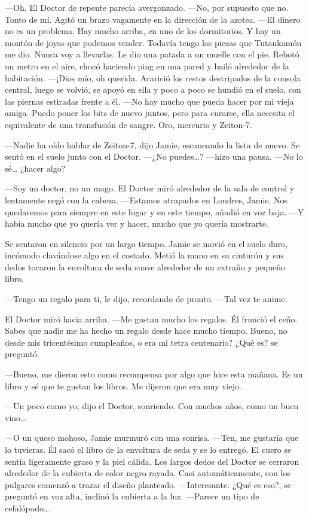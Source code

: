 ---Oh. El Doctor de repente parecía avergonzado. ---No, por supuesto que
no. Tonto de mí. Agitó un brazo vagamente en la dirección de la azotea.
---El dinero no es un problema. Hay mucho arriba, en uno de los
dormitorios. Y hay un montón de joyas que podemos vender. Todavía tengo
las piezas que Tutankamón me dio. Nunca voy a llevarlas. Le dio una
patada a un muelle con el pie. Rebotó un metro en el aire, chocó
haciendo ping en una pared y bailó alrededor de la habitación. ---¡Dios
mío, oh querida. Acarició los restos destripados de la consola central,
luego se volvió, se apoyó en ella y poco a poco se hundió en el suelo,
con las piernas estiradas frente a él. ---No hay mucho que pueda hacer
por mi vieja amiga. Puedo poner los bits de nuevo juntos, pero para
curarse, ella necesita el equivalente de una transfusión de sangre. Oro,
mercurio y Zeiton-7.

---Nadie ha oído hablar de Zeiton-7, dijo Jamie, escaneando la lista de
nuevo. Se sentó en el suelo junto con el Doctor. ---¿No puedes\ldots{}?
---hizo una pausa. ---No lo sé\ldots{} ¿hacer algo?

---Soy un doctor, no un mago. El Doctor miró alrededor de la sala de
control y lentamente negó con la cabeza. ---Estamos atrapados en
Londres, Jamie. Nos quedaremos para siempre en este lugar y en este
tiempo, añadió en voz baja. ---Y había mucho que yo quería ver y hacer,
mucho que yo quería mostrarte.

Se sentaron en silencio por un largo tiempo. Jamie se movió en el suelo
duro, incómodo clavándose algo en el costado. Metió la mano en su
cinturón y sus dedos tocaron la envoltura de seda suave alrededor de un
extraño y pequeño libro.

---Tengo un regalo para ti, le dijo, recordando de pronto. ---Tal vez te
anime.

El Doctor miró hacia arriba. ---Me gustan mucho los regalos. Él frunció
el ceño. Sabes que nadie me ha hecho un regalo desde hace mucho tiempo.
Bueno, no desde mis tricentésimo cumpleaños, o era mi tetra centenario?
¿Qué es? se preguntó.

---Bueno, me dieron esto como  recompensa por algo que hice esta mañana.
Es un libro y sé que te gustan los libros. Me dijeron que era muy viejo.

---Un poco como yo, dijo el Doctor, sonriendo. Con muchos años, como un
buen vino\ldots{}

---O un queso mohoso, Jamie murmuró con una sonrisa. ---Ten, me gustaría
que lo tuvieras. Él sacó el libro de la envoltura de seda y se lo
entregó. El cuero se sentía ligeramente graso y la piel cálida. Los
largos dedos del Doctor se cerraron alrededor de la cubierta de color
negro rayada. Casi automáticamente, con los pulgares comenzó a trazar el
diseño planteado. ---Interesante. ¿Qué es eso?, se preguntó en voz alta,
inclinó  la cubierta a la luz. ---Parece un tipo de cefalópodo\ldots{}

